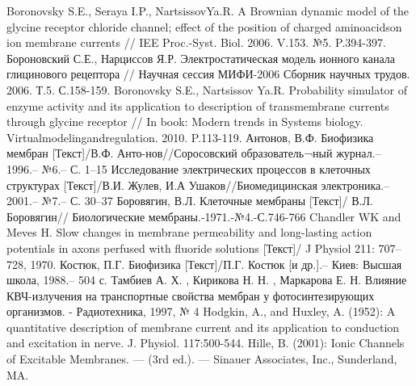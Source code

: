 \begin{thebibliography}{99}
 Boronovsky S.E., Seraya I.P., NartsissovYa.R. A Brownian dynamic model of the glycine receptor chloride channel; effect of the position of charged aminoacidson ion membrane currents // IEE Proc.-Syst. Biol. 2006. V.153. №5. P.394-397.
 Бороновский С.Е., Нарциссов Я.Р. Электростатическая модель ионного канала глицинового рецептора // Научная сессия МИФИ-2006 Сборник научных трудов. 2006. Т.5. С.158-159.
 Boronovsky S.E., Nartsissov Ya.R. Probability simulator of enzyme activity and its application to description of transmembrane currents through glycine receptor // In book: Modern trends in Systems biology. Virtualmodelingandregulation. 2010. P.113-119.
 Антонов, В.Ф. Биофизика мембран [Текст]/В.Ф. Анто-нов//Соросовский образователь¬ный журнал.– 1996.– №6.– С. 1–15
 Исследование электрических процессов в клеточных структурах [Текст]/В.И. Жулев, И.А Ушаков//Биомедицинская электроника.– 2001.– №7.– С. 30–37
 Боровягин, В.Л. Клеточные мембраны [Текст]/ В.Л. Боровягин// Биологические мембраны.-1971.-№4.-С.746-766
 Chandler WK and Meves H. Slow changes in membrane permeability and long-lasting action potentials in axons perfused with fluoride solutions [Текст]/ J Physiol 211: 707–728, 1970.
 Костюк, П.Г. Биофизика [Текст]/П.Г. Костюк [и др.].– Киев: Высшая школа, 1988.– 504 с.
 Тамбиев А. Х. , Кирикова Н. Н. , Маркарова Е. Н. Влияние КВЧ-излучения на транспортные свойства мембран у фотосинтезирующих организмов. - Радиотехника, 1997, № 4
 Hodgkin, A., and Huxley, A. (1952): A quantitative description of membrane current and its application to conduction and excitation in nerve. J. Physiol. 117:500-544.
 Hille, B. (2001): Ionic Channels of Excitable Membranes. — (3rd ed.). — Sinauer Associates, Inc., Sunderland, MA.
\end{thebibliography}
